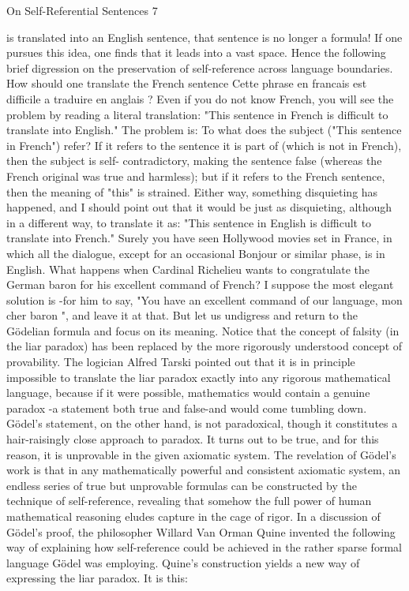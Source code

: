 On Self-Referential Sentences                                                            7

is translated into an English sentence, that sentence is no longer a formula!
         If one pursues this idea, one finds that it leads into a vast space. Hence the
following brief digression on the preservation of self-reference across language
boundaries. How should one translate the French sentence Cette phrase en francais est
difficile a traduire en anglais ? Even if you do not know French, you will see the problem
by reading a literal translation: "This sentence in French is difficult to translate into
English." The problem is: To what does the subject ("This sentence in French") refer? If
it refers to the sentence it is part of (which is not in French), then the subject is self-
contradictory, making the sentence false (whereas the French original was true and
harmless); but if it refers to the French sentence, then the meaning of "this" is strained.
Either way, something disquieting has happened, and I should point out that it would be
just as disquieting, although in a different way, to translate it as: "This sentence in
English is difficult to translate into French." Surely you have seen Hollywood movies set
in France, in which all the dialogue, except for an occasional Bonjour or similar phase, is
in English. What happens when Cardinal Richelieu wants to congratulate the German
baron for his excellent command of French? I suppose the most elegant solution is -for
him to say, "You have an excellent command of our language, mon cher baron ", and
leave it at that.
         But let us undigress and return to the Gödelian formula and focus on its meaning.
Notice that the concept of falsity (in the liar paradox) has been replaced by the more
rigorously understood concept of provability. The logician Alfred Tarski pointed out that
it is in principle impossible to translate the liar paradox exactly into any rigorous
mathematical language, because if it were possible, mathematics would contain a genuine
paradox -a statement both true and false-and would come tumbling down.
         Gödel’s statement, on the other hand, is not paradoxical, though it constitutes a
hair-raisingly close approach to paradox. It turns out to be true, and for this reason, it is
unprovable in the given axiomatic system. The revelation of Gödel’s work is that in any
mathematically powerful and consistent axiomatic system, an endless series of true but
unprovable formulas can be constructed by the technique of self-reference, revealing that
somehow the full power of human mathematical reasoning eludes capture in the cage of
rigor.
         In a discussion of Gödel’s proof, the philosopher Willard Van Orman Quine
invented the following way of explaining how self-reference could be achieved in the
rather sparse formal language Gödel was employing. Quine's construction yields a new
way of expressing the liar paradox. It is this:




